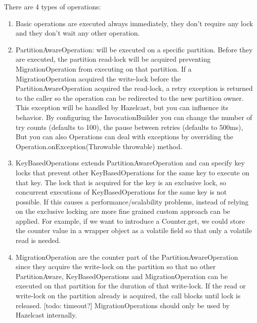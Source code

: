 There are 4 types of operations:
\begin{enumerate}
\item Basic operations are executed always immediately, they don't require any lock and they don't wait any other operation.
\item PartitionAwareOperation: will be executed on a specific partition. Before they are executed, the partition read-lock will be acquired preventing MigrationOperation from executing on that partition. If a MigrationOperation acquired the write-lock before the PartitionAwareOperation acquired the read-lock, a retry exception is returned to the caller so the operation can be redirected to the new partition owner. This exception will be handled by Hazelcast, but you can influence its behavior. By configuring the InvocationBuilder you can change the number of try counts (defaults to 100), the pause between retries (defaults to 500ms), But you can also Operations can deal with exceptions by overriding the Operation.onException(Throwable throwable) method.
\item KeyBasedOperations extends PartitionAwareOperation and can specify key locks that prevent other KeyBasedOperations for the same key to execute on that key. The lock that is acquired for the key is an exclusive lock, so concurrent executions of  KeyBasedOperations for the same key is not possible. If this causes a performance/scalability problems, instead of relying on the exclusive locking are more fine grained custom approach can be applied. For example, if we want to introduce a Counter.get, we could store the counter value in a wrapper object as a volatile field so that only a volatile read is needed.
\item MigrationOperation are the counter part of the PartitionAwareOperation since they acquire the write-lock on the partition so that no other PartitionAware, KeyBasedOperations and MigrationOperation can be executed on that partition for the duration of that write-lock. If the read or write-lock on the partition already is acquired, the call blocks until lock is released. [todo: timeout?] MigrationOperations should only be used by Hazelcast internally.
\end{enumerate}



